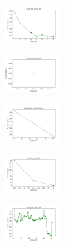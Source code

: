 \begin{figure}[H]
    \begin{subfigure}
        \centering
        \includegraphics[width=0.234\textwidth]{img/copkm/ecoli_set_const_10_589741062_cost.png}
    \end{subfigure}
    \hfill
    \begin{subfigure}
        \centering
        \includegraphics[width=0.234\textwidth]{img/copkm/rand_set_const_10_589741062_cost.png}
    \end{subfigure}
    \hfill
    \begin{subfigure}
        \centering
        \includegraphics[width=0.234\textwidth]{img/copkm/newthyroid_set_const_10_589741062_cost.png}
    \end{subfigure}
    \hfill
    \begin{subfigure}
        \centering
        \includegraphics[width=0.234\textwidth]{img/copkm/iris_set_const_10_277451237_cost.png}
    \end{subfigure}
    \hfill
    \begin{subfigure}
        \centering
        \includegraphics[width=0.234\textwidth]{img/copkm/ecoli_set_const_10_277451237_cost.png}
    \end{subfigure}
    \hfill
    \begin{subfigure}
        \centering

\end{subfigure}
\end{figure}
